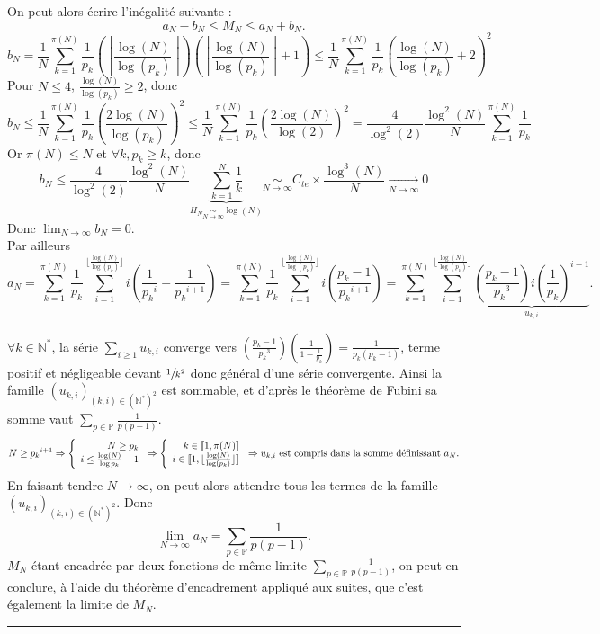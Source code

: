 \documentclass[a4paper, 12pt]{article}
\newcommand{\N}{\mathbb{N}}
\newcommand{\Pm}{\mathbb{P}}
\newcommand{\cqfd}{\rule{0.2cm}{0.2cm}}
\begin{document}
On peut alors écrire l'inégalité suivante : \[a_N - b_N \le M_N \le a_N + b_N. \] 
 \[ b_N = \frac{1}{N} \sum_{k=1}^{\pi(N)} \frac{1}{p_k} \left(\left\lfloor \frac{\log(N)}{\log(p_k)} \right\rfloor\right) \left(\left\lfloor \frac{\log(N)}{\log(p_k)} \right\rfloor +1\right) \le \frac{1}{N} \sum_{k=1}^{\pi(N)} \frac{1}{p_k} \left( \frac{\log(N)}{\log(p_k)} +2 \right)^{2} \]
Pour $N \le 4$, $\frac{\log(N)}{\log(p_k)} \ge 2$, donc
 \[ b_N \le \frac{1}{N} \sum_{k=1}^{\pi(N)} \frac{1}{p_k} \left( \frac{2\log(N)}{\log(p_k)} \right)^{2} \le \frac{1}{N} \sum_{k=1}^{\pi(N)} \frac{1}{p_k} \left( \frac{2\log(N)}{\log(2)} \right)^{2} = \frac{4}{\log^{2}(2)} \frac{\log^{2}(N)}{N} \sum_{k=1}^{\pi(N)} \frac{1}{p_k} \]
 Or $\pi(N) \le N$ et $\forall k, p_k \ge k$, donc
 \[ b_N \le \frac{4}{\log^{2}(2)} \frac{\log^{2}(N)}{N} \underbrace{\sum_{k=1}^{N} \frac{1}{k}}_{H_N \underset{N \to \infty}{\sim}\log(N)} \underset{N \to \infty}{\sim} C_{te} \times \frac{\log^{3}(N)}{N} \underset{N\to \infty}{\longrightarrow} 0\]
Donc $\lim_{N \to \infty} b_N = 0.$ \\

Par ailleurs
\[a_N = \sum_{k=1}^{\pi(N)} \frac{1}{p_k} \sum_{i=1}^{\lfloor \frac{\log(N)}{\log(p_k)} \rfloor} i \left(\frac{1}{{p_k}^i} -  \frac{1}{{p_k}^{i+1}} \right) = \sum_{k=1}^{\pi(N)} \frac{1}{p_k} \sum_{i=1}^{\lfloor \frac{\log(N)}{\log(p_k)} \rfloor} i \left(\frac{p_k-1}{{p_k}^{i+1}}\right) = \sum_{k=1}^{\pi(N)} \sum_{i=1}^{\lfloor \frac{\log(N)}{\log(p_k)} \rfloor} \underbrace{\left(\frac{p_k-1}{{p_k}^3}\right) i \left(\frac{1}{p_k}\right)^{i-1}}_{u_{k,i}}. \]

$\forall k \in \N^{*}$, la série $\sum_{i\ge1}^{}u_{k,i}$ converge vers $\left(\frac{p_k-1}{{p_k}^3}\right)\left(\frac{1}{1-\frac{1}{p_k}}\right)=\frac{1}{p_k(p_k-1)}$, terme positif et négligeable devant $\sfrac{1}{k^2}$ donc général d'une série convergente. Ainsi la famille $(u_{k,i})_{(k,i)\in (\N^{*})^2}$ est sommable, et d'après le théorème de Fubini sa somme vaut $\sum_{p \in \Pm}^{} \frac{1}{p(p-1)}$.\\

\[ N\ge{p_k}^{i+1} \Rightarrow
\left\{\begin{array}{r c l}
N\ge p_k\\
i\le \frac{\log(N)}{\log{p_k}}-1
\end{array} \right.
\Rightarrow
\left\{\begin{array}{r c l}
k \in [\![1, \pi(N)]\!]\\
i \in [\![1, \lfloor \frac{\log(N)}{\log(p_k)} \rfloor]\!]
\end{array} \right. \Rightarrow \text{$u_{k,i}$ est compris dans la somme définissant $a_N$.} \]
En faisant tendre $N \to \infty$, on peut alors attendre tous les termes de la famille $(u_{k,i})_{(k,i)\in (\N^{*})^2}$. Donc
\[\lim_{N \to \infty} a_N = \sum_{p \in \Pm}^{} \frac{1}{p(p-1)}.\]
$M_N$ étant encadrée par deux fonctions de même limite $\sum_{p \in \Pm}^{} \frac{1}{p(p-1)}$, on peut en conclure, à l'aide du théorème d'encadrement appliqué aux suites, que c'est également la limite de $M_N$. \cqfd \\ \\
\end{document}
